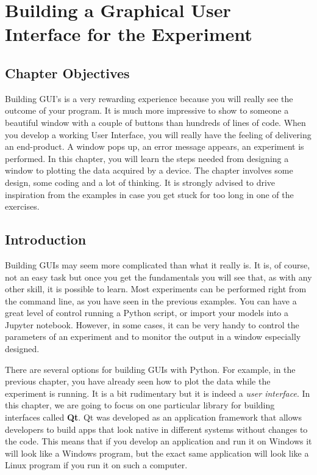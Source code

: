 \chapter[A GUI for the Experiment]{Building a Graphical User Interface for the Experiment}\label{building-a-graphical-user-interface-for-theexperiment}

\section{Chapter Objectives}\label{chapterobjectives}
Building {GUI}'s is a very rewarding experience because you will really
see the outcome of your program. It is much more impressive to show to
someone a beautiful window with a couple of buttons than hundreds of
lines of code. When you develop a working User Interface, you will
really have the feeling of delivering an end-product. A window pops up,
an error message appears, an experiment is performed. In this chapter,
you will learn the steps needed from designing a window to plotting the
data acquired by a device. The chapter involves some design, some coding
and a lot of thinking. It is strongly advised to drive inspiration from
the examples in case you get stuck for too long in one of the exercises.

\section{Introduction}\label{introduction}
Building GUIs may seem more complicated than what it really is. It is,
of course, not an easy task but once you get the fundamentals you will
see that, as with any other skill, it is possible to learn. Most
experiments can be performed right from the command line, as you have
seen in the previous examples. You can have a great level of control
running a Python script, or import your models into a Jupyter notebook.
However, in some cases, it can be very handy to control the parameters
of an experiment and to monitor the output in a window
especially designed.

There are several options for building GUIs with Python. For example, in
the previous chapter, you have already seen how to plot the data while
the experiment is running. It is a bit rudimentary but it is indeed a
\emph{user interface}. In this chapter, we are going to focus on one
particular library for building interfaces called \textbf{Qt}. Qt was
developed as an application framework that allows developers to build
apps that look native in different systems without changes to the code.
This means that if you develop an application and run it on Windows it
will look like a Windows program, but the exact same application will
look like a Linux program if you run it on such a computer.

